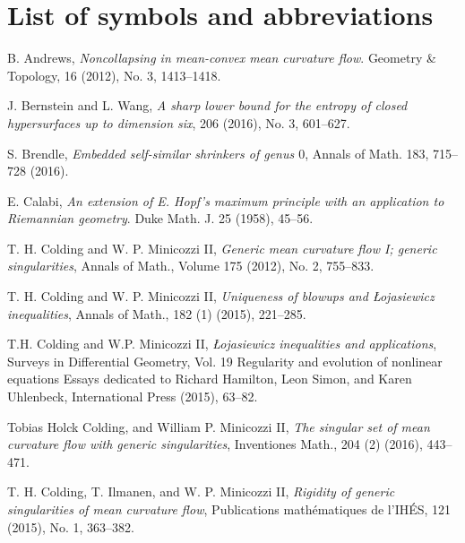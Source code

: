 \documentclass{amsart}
\theoremstyle{definition}
\begin{document}
\section{List of symbols and abbreviations}


 \begin{thebibliography}{A}

B. Andrews, {\emph{Noncollapsing in mean-convex mean curvature flow}}. 
Geometry \& Topology, 16 (2012), No. 3, 1413--1418.
 
J. Bernstein and L. Wang, \emph{A sharp lower bound for the entropy of closed hypersurfaces up to dimension six}, 
206 (2016), No. 3, 601--627.

S. Brendle, \emph{Embedded self-similar shrinkers of genus $0$}, Annals of Math. 183, 715--728 (2016).

E. Calabi, \emph{An extension of E. Hopf's maximum principle with an application to Riemannian geometry}.
Duke Math. J. 25 (1958), 45--56.

T. H. Colding and W. P. Minicozzi II,
\emph{Generic mean curvature flow I; generic singularities},  Annals of Math., Volume 175 (2012), No. 2, 755--833.

T. H. Colding and W. P. Minicozzi II, \emph{Uniqueness of blowups and \L{}ojasiewicz inequalities}, Annals of Math., 182 (1) (2015), 221--285.

T.H. Colding and W.P. Minicozzi II, \emph{\L{}ojasiewicz inequalities and applications}, Surveys in Differential Geometry, Vol. 19
Regularity and evolution of nonlinear equations
Essays dedicated to Richard Hamilton, Leon Simon, and Karen Uhlenbeck, International Press (2015), 63--82.

Tobias Holck Colding, and William P. Minicozzi II, \emph{The singular set of mean curvature flow with generic singularities}, 
Inventiones Math., 204 (2) (2016), 443--471.
 
  T. H. Colding, T. Ilmanen, and W. P. Minicozzi II, {\emph{Rigidity of generic singularities of mean curvature flow}}, 
 Publications math\'{e}matiques de l'IH\'{E}S,  121 (2015), No. 1, 363--382.
 

\end{thebibliography}
\end{document}
